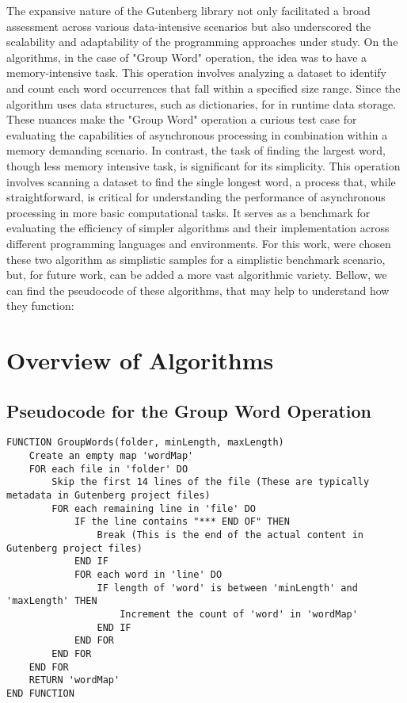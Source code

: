 The expansive nature of the Gutenberg library not only facilitated a broad assessment across various data-intensive scenarios but also underscored the scalability and adaptability of the programming approaches under study. 
On the algorithms, in the case of "Group Word" operation, the idea was to have a memory-intensive task. This operation involves analyzing a dataset to identify and count each word occurrences that fall within a specified size range. Since the algorithm uses data structures, such as dictionaries, for in runtime data storage. These nuances make the "Group Word" operation a curious test case for evaluating the capabilities of asynchronous processing in combination within a memory demanding scenario.
In contrast, the task of finding the largest word, though less memory intensive task, is significant for its simplicity. This operation involves scanning a dataset to find the single longest word, a process that, while straightforward, is critical for understanding the performance of asynchronous processing in more basic computational tasks. It serves as a benchmark for evaluating the efficiency of simpler algorithms and their implementation across different programming languages and environments.
For this work, were chosen these two algorithm as simplistic samples for a simplistic benchmark scenario, but, for future work, can be added a more vast algorithmic variety.
Bellow, we can find the pseudocode of these algorithms, that may help to understand how they function:


\section{Overview of Algorithms}
\label{sec:algorithm_overview}


\subsection*{Pseudocode for the Group Word Operation}
\begin{lstlisting}[language={}, caption={Pseudocode for GroupWords function}, label={lst:groupwords}]
FUNCTION GroupWords(folder, minLength, maxLength)
    Create an empty map 'wordMap'
    FOR each file in 'folder' DO
        Skip the first 14 lines of the file (These are typically metadata in Gutenberg project files)
        FOR each remaining line in 'file' DO
            IF the line contains "*** END OF" THEN
                Break (This is the end of the actual content in Gutenberg project files)
            END IF
            FOR each word in 'line' DO
                IF length of 'word' is between 'minLength' and 'maxLength' THEN
                    Increment the count of 'word' in 'wordMap'
                END IF
            END FOR
        END FOR
    END FOR
    RETURN 'wordMap'
END FUNCTION
\end{lstlisting}

